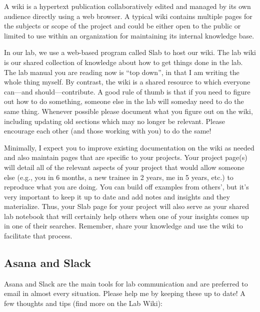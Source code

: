 \documentclass[letterpaper,11pt,oneside]{memoir}
\begin{document}
\begin{displayquote}
A wiki is a hypertext publication collaboratively edited and managed by its own audience directly using a web browser. A typical wiki contains multiple pages for the subjects or scope of the project and could be either open to the public or limited to use within an organization for maintaining its internal knowledge base.
\end{displayquote}

In our lab, we use a web-based program called Slab to host our wiki. The lab wiki is our shared collection of knowledge about how to get things done in the lab. The lab manual you are reading now is ``top down'', in that I am writing the whole thing myself. By contrast, the wiki is a shared resource to which everyone can---and should---contribute. A good rule of thumb is that if you need to figure out how to do something, someone else in the lab will someday need to do the same thing. Whenever possible please document what you figure out on the wiki, including updating old sections which may no longer be relevant. Please encourage each other (and those working with you) to do the same!

Minimally, I expect you to improve existing documentation on the wiki as needed and also maintain pages that are specific to your projects. Your project page(s) will detail all of the relevant aspects of your project that would allow someone else (e.g., you in 6 months, a new trainee in 2 years, me in 5 years, etc.) to reproduce what you are doing. You can build off examples from others', but it's very important to keep it up to date and add notes and insights and they materialize. Thus, your Slab page for your project will also serve as your shared lab notebook that will certainly help others when one of your insights comes up in one of their searches. Remember, share your knowledge and use the wiki to facilitate that process.


\subsection{Asana and Slack}
Asana and Slack are the main tools for lab communication and are preferred to email in almost every situation. Please help me by keeping these up to date! A few thoughts and tips (find more on the Lab Wiki):
\end{document}
